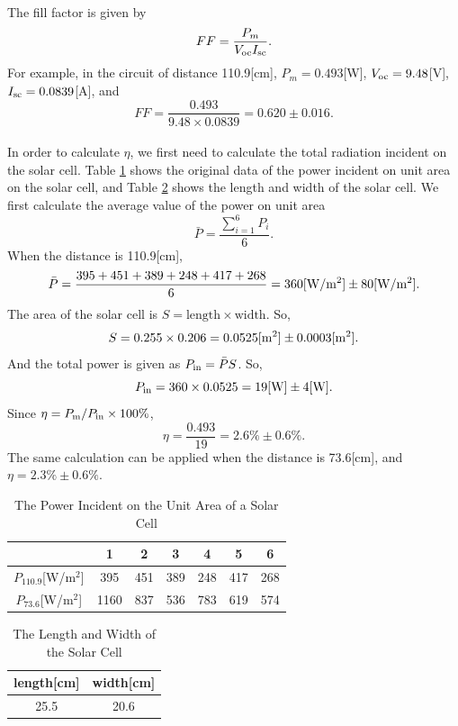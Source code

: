 \documentclass[a4paper]{article}
\newcommand{\V}{{V_{\rm oc}}}
\newcommand{\I}{{I_{\rm sc}}}
\begin{document}
    \paragraph{} The fill factor is given by $$FF=\frac{P_m}{V_{\rm oc}I_{\rm sc}}.$$ For example, in the circuit of distance 110.9[cm], $P_m=0.493$[W], $\V=9.48$[V], $\I=0.0839$[A], and $$FF=\frac{0.493}{9.48\times 0.0839}=0.620\pm 0.016.$$
    \paragraph{} In order to calculate $\eta$, we first need to calculate the total radiation incident on the solar cell. Table \ref{tab:originalpower} shows the original data of the power incident on unit area on the solar cell, and Table \ref{tab:area} shows the length and width of the solar cell. We first calculate the average value of the power on unit area $$\bar{P}=\frac{\sum_{i=1}^6P_i}{6}.$$ When the distance is 110.9[cm], $$\bar{P}=\frac{395+451+389+248+417+268}{6}=360[\rm W/m^2]\pm 80[W/m^2].$$ The area of the solar cell is $S=\text{length}\times \text{width}$. So, $$S=0.255\times 0.206=0.0525[\rm m^2]\pm 0.0003[m^2].$$ And the total power is given as $P_{\rm in}=\bar{P}S$. So, $$P_{\rm in}=360\times 0.0525=19[\rm W]\pm 4[W].$$ Since $\eta=P_{\rm m}/P_{\rm in}\times 100\%$, $$\eta=\frac{0.493}{19}=2.6\%\pm 0.6\%.$$ The same calculation can be applied when the distance is 73.6[cm], and $\eta=2.3\%\pm 0.6\%.$
    \begin{table}[!ht]
        \centering
        \begin{tabular}{|c|c|c|c|c|c|c|}
            \hline
            &1&2&3&4&5&6\\\hline
            $P_{110.9}$[W/m$^2$]&395&451&389&248&417&268\\\hline
            $P_{73.6}$[W/m$^2$]&1160&837&536&783&619&574\\\hline
        \end{tabular}
        \caption{The Power Incident on the Unit Area of a Solar Cell}
        \label{tab:originalpower}
    \end{table}
    \begin{table}[!ht]
        \centering
        \begin{tabular}{|c|c|}
            \hline
            length[cm]&width[cm]\\\hline
            25.5&20.6\\\hline
        \end{tabular}
        \caption{The Length and Width of the Solar Cell}
        \label{tab:area}
    \end{table}
\end{document}
